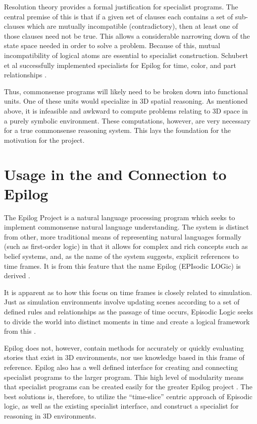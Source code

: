 Resolution theory provides a formal justification for specialist programs. The central premise of this is that if a given set of clauses each contains a set of sub-clauses which are mutually incompatible (contradictory), then at least one of those clauses need not be true. This allows a considerable narrowing down of the state space needed in order to solve a problem. Because of this, mutual incompatibility of logical atoms are essential to specialist construction. Schubert et al successfully implemented specialists for Epilog for time, color, and part relationships \cite{schubert1983determining,schubert1987accelerating,schubert2000episodic}. 

Thus, commonsense programs will likely need to be broken down into functional units. One of these units would specialize in 3D spatial reasoning. As mentioned above, it is infeasible and awkward to compute problems relating to 3D space in a purely symbolic environment. These computations, however, are very necessary for a true commonsense reasoning system. This lays the foundation for the motivation for the \TDS project. 

\section{Usage in the \TDS and Connection to Epilog}
The Epilog Project is a natural language processing program which seeks to implement commonsense natural language understanding. The system is distinct from other, more traditional means of representing natural languages formally (such as first-order logic) in that it allows for complex and rich concepts such as belief systems, and, as the name of the system suggests, explicit references to time frames. It is from this feature that the name Epilog (EPIsodic LOGic) is derived \cite{schubert2000episodic}.

It is apparent as to how this focus on time frames is closely related to simulation. Just as simulation environments involve updating scenes according to a set of defined rules and relationships as the passage of time occurs, Episodic Logic seeks to divide the world into distinct moments in time and create a logical framework from this \cite{selman1998analogical,schubert2000episodic}.

Epilog does not, however, contain methods for accurately or quickly evaluating stories that exist in 3D environments, nor use knowledge based in this frame of reference. Epilog also has a well defined interface for creating and connecting specialist programs to the larger program. This high level of modularity means that specialist programs can be created easily for the greater Epilog project \cite{schubert2000episodic}. The best solutions is, therefore, to utilize the ``time-slice'' centric approach of Episodic logic, as well as the existing specialist interface, and construct a specialist for reasoning in 3D environments.

